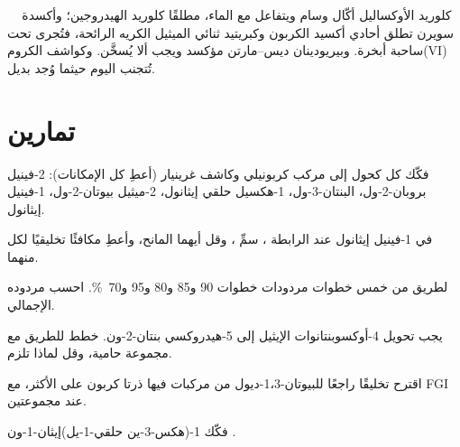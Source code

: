 \begin{safety}{\,\,\,\,\,}
كلوريد الأوكساليل أكّال وسام ويتفاعل مع الماء، مطلقًا كلوريد الهيدروجين؛ وأكسدة سويرن
تطلق أحادي أكسيد الكربون وكبريتيد ثنائي الميثيل الكريه الرائحة، فتُجرى تحت ساحبة أبخرة.
وبيريودينان ديس--مارتن مؤكسد ويجب ألا يُسخَّن. وكواشف الكروم(VI) تُتجنب اليوم
حيثما وُجد بديل.
\end{safety}

\section{تمارين}

\begin{exercise}[$\star$]\label{exo:b2:retrosynthesis:1}
فكّك كل كحول إلى مركب كربونيلي وكاشف غرينيار (أعطِ كل الإمكانات):
2-فينيل بروبان-2-ول، البنتان-3-ول، 1-هكسيل حلقي إيثانول، 2-ميثيل بيوتان-2-ول، 1-فينيل إيثانول.
\end{exercise}

\begin{exercise}[$\star$]\label{exo:b2:retrosynthesis:2}
في  1-فينيل إيثانول عند الرابطة ، سمِّ ، وقل أيهما
المانح، وأعطِ مكافئًا تخليقيًا لكل منهما.
\end{exercise}

\begin{exercise}[$\star$]\label{exo:b2:retrosynthesis:3}
لطريق من خمس خطوات مردودات خطوات 90 و85 و80 و95 و70~\%. احسب مردوده الإجمالي.
\end{exercise}

\begin{exercise}[$\star$]\label{exo:b2:retrosynthesis:4}
يجب تحويل 4-أوكسوبنتانوات الإيثيل إلى 5-هيدروكسي بنتان-2-ون. خطط للطريق مع مجموعة
حامية، وقل لماذا تلزم.
\end{exercise}

\begin{exercise}[$\star\star$]\label{exo:b2:retrosynthesis:5}
اقترح تخليقًا راجعًا للبيوتان-1،3-ديول من مركبات فيها ذرتا كربون على الأكثر، مع FGI 
 عند مجموعتين.
\end{exercise}

\begin{exercise}[$\star\star$]\label{exo:b2:retrosynthesis:6}
فكّك 1-(هكس-3-ين حلقي-1-يل)إيثان-1-ون .
\end{exercise}


